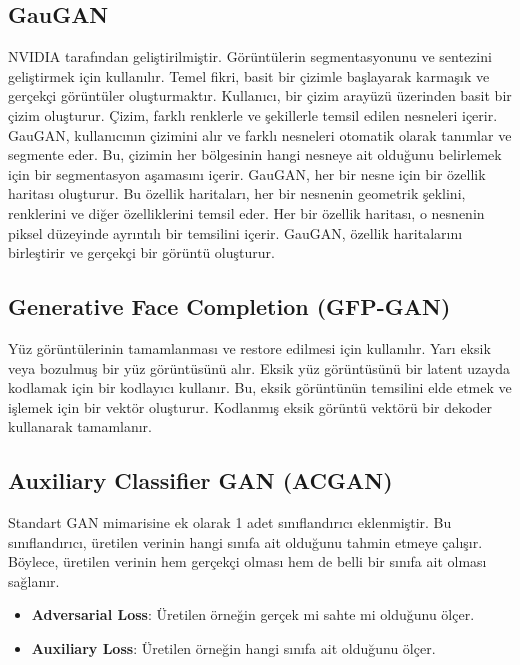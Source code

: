 \newpage

\subsection{GauGAN}
NVIDIA tarafından geliştirilmiştir. Görüntülerin segmentasyonunu ve sentezini geliştirmek için kullanılır. Temel fikri, basit bir çizimle başlayarak karmaşık ve gerçekçi görüntüler oluşturmaktır. Kullanıcı, bir çizim arayüzü üzerinden basit bir çizim oluşturur. Çizim, farklı renklerle ve şekillerle temsil edilen nesneleri içerir. GauGAN, kullanıcının çizimini alır ve farklı nesneleri otomatik olarak tanımlar ve segmente eder. Bu, çizimin her bölgesinin hangi nesneye ait olduğunu belirlemek için bir segmentasyon aşamasını içerir. GauGAN, her bir nesne için bir özellik haritası oluşturur. Bu özellik haritaları, her bir nesnenin geometrik şeklini, renklerini ve diğer özelliklerini temsil eder. Her bir özellik haritası, o nesnenin piksel düzeyinde ayrıntılı bir temsilini içerir. GauGAN, özellik haritalarını birleştirir ve gerçekçi bir görüntü oluşturur.

\newpage

\subsection{Generative Face Completion (GFP-GAN)}
Yüz görüntülerinin tamamlanması ve restore edilmesi için kullanılır. Yarı eksik veya bozulmuş bir yüz görüntüsünü alır. Eksik yüz görüntüsünü bir latent uzayda kodlamak için bir kodlayıcı kullanır. Bu, eksik görüntünün temsilini elde etmek ve işlemek için bir vektör oluşturur. Kodlanmış eksik görüntü vektörü bir dekoder kullanarak tamamlanır. 

\newpage

\subsection{Auxiliary Classifier GAN (ACGAN)}
Standart GAN mimarisine ek olarak 1 adet sınıflandırıcı eklenmiştir. Bu sınıflandırıcı, üretilen verinin hangi sınıfa ait olduğunu tahmin etmeye çalışır. Böylece, üretilen verinin hem gerçekçi olması hem de belli bir sınıfa ait olması sağlanır.

\begin{itemize}
    \item \textbf{Adversarial Loss}: Üretilen örneğin gerçek mi sahte mi olduğunu ölçer.
    \item \textbf{Auxiliary Loss}: Üretilen örneğin hangi sınıfa ait olduğunu ölçer.
\end{itemize}

